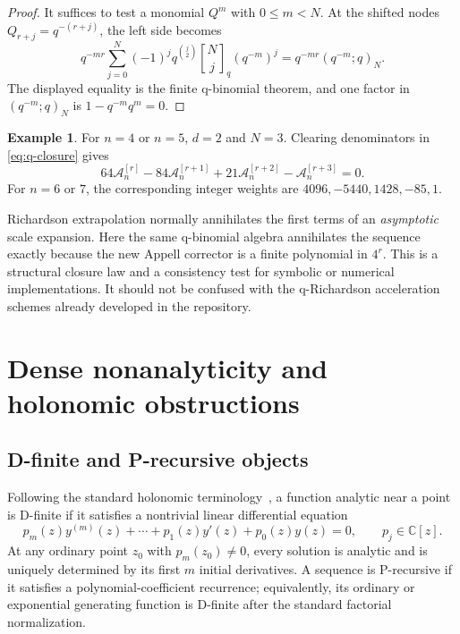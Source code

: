 \documentclass[11pt,oneside]{article}
\theoremstyle{definition}
\newtheorem{example}[theorem]{Example}
\theoremstyle{remark}
\newcommand{\C}{\mathbb C}
\newcommand{\qbinom}[3]{\genfrac{[}{]}{0pt}{}{#1}{#2}_{#3}}
\newcommand{\Acard}{\mathcal A}
\begin{document}
\begin{proof}
It suffices to test a monomial $Q^m$ with $0\le m<N$.  At the shifted nodes $Q_{r+j}=q^{-(r+j)}$, the left side becomes
\[
 q^{-mr}\sum_{j=0}^{N}(-1)^jq^{\binom j2}
 \qbinom{N}{j}{q}(q^{-m})^j
 =q^{-mr}(q^{-m};q)_N.
\]
The displayed equality is the finite q-binomial theorem, and one factor in $(q^{-m};q)_N$ is $1-q^{-m}q^m=0$.
\end{proof}

\begin{example}
For $n=4$ or $n=5$, $d=2$ and $N=3$.  Clearing denominators in \eqref{eq:q-closure} gives
\begin{equation}
 64\Acard_n^{[r]}-84\Acard_n^{[r+1]}
 +21\Acard_n^{[r+2]}-\Acard_n^{[r+3]}=0.
 \label{eq:q-closure-example}
\end{equation}
For $n=6$ or $7$, the corresponding integer weights are
$4096,-5440,1428,-85,1$.
\end{example}

\begin{corpusdeductionbox}[title={Exact closure, not asymptotic acceleration}]
Richardson extrapolation normally annihilates the first terms of an \emph{asymptotic} scale expansion.  Here the same q-binomial algebra annihilates the sequence exactly because the new Appell corrector is a finite polynomial in $4^r$.  This is a structural closure law and a consistency test for symbolic or numerical implementations.  It should not be confused with the q-Richardson acceleration schemes already developed in the repository.
\end{corpusdeductionbox}

\section{Dense nonanalyticity and holonomic obstructions}
\label{sec:holonomic}

\subsection{D-finite and P-recursive objects}
Following the standard holonomic terminology~\cite{stanley}, a function analytic near a point is D-finite if it satisfies a nontrivial linear differential equation
\begin{equation}
 p_m(z)y^{(m)}(z)+\cdots+p_1(z)y'(z)+p_0(z)y(z)=0,
 \qquad p_j\in\C[z].
 \label{eq:Dfinite}
\end{equation}
At any ordinary point $z_0$ with $p_m(z_0)\ne0$, every solution is analytic and is uniquely determined by its first $m$ initial derivatives.  A sequence is P-recursive if it satisfies a polynomial-coefficient recurrence; equivalently, its ordinary or exponential generating function is D-finite after the standard factorial normalization.
\end{document}
